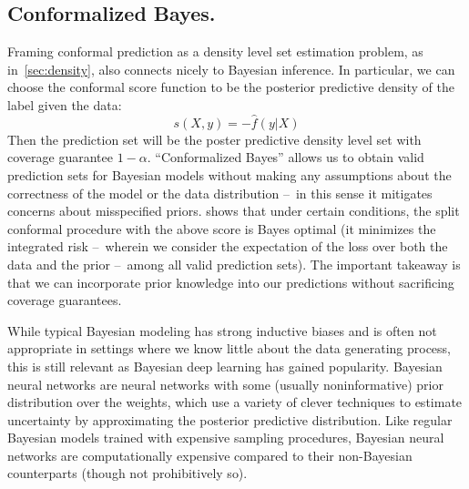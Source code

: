 \documentclass[a4paper, 12pt]{article}
\begin{document}

\subsection{Conformalized Bayes.}
\label{sec:bayes}
Framing conformal prediction as a density level set estimation problem, as in~\ref{sec:density}, also connects nicely to Bayesian inference. In particular, we can choose the conformal score function to be the posterior predictive density of the label given the data:
\[ s(X, y) = -\hat{f}(y | X) \]
Then the prediction set will be the poster predictive density level set with coverage guarantee $1-\alpha$. ``Conformalized Bayes'' allows us to obtain valid prediction sets for Bayesian models without making any assumptions about the correctness of the model or the data distribution --\ in this sense it mitigates concerns about misspecified priors. \textcite{hoffBayesoptimalPredictionFrequentist2021} shows that under certain conditions, the split conformal procedure with the above score is Bayes optimal (it minimizes the integrated risk --\ wherein we consider the expectation of the loss over both the data and the prior --\ among all valid prediction sets). The important takeaway is that we can incorporate prior knowledge into our predictions without sacrificing coverage guarantees.

While typical Bayesian modeling has strong inductive biases and is often not appropriate in settings where we know little about the data generating process, this is still relevant as Bayesian deep learning \autocite{mackayBayesianMethodsAdaptive1992,galDropoutBayesianApproximation2016,wilsonBayesianDeepLearning2020} has gained popularity. Bayesian neural networks are neural networks with some (usually noninformative) prior distribution over the weights, which use a variety of clever techniques to estimate uncertainty by approximating the posterior predictive distribution. Like regular Bayesian models trained with expensive sampling procedures, Bayesian neural networks are computationally expensive compared to their non-Bayesian counterparts (though not prohibitively so).
\end{document}
